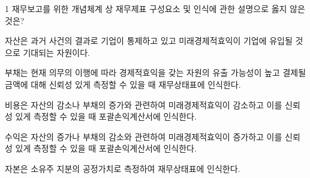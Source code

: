 \begin{question}{1}
재무보고를 위한 개념체계 상 재무제표 구성요소 및 인식에 관한 설명으로 옳지 않은 것은?
\begin{choices}
  \item 자산은 과거 사건의 결과로 기업이 통제하고 있고 미래경제적효익이 기업에 유입될 것으로 기대되는 자원이다.
  \item 부채는 현재 의무의 이행에 따라 경제적효익을 갖는 자원의 유출 가능성이 높고 결제될 금액에 대해 신뢰성 있게 측정할 수 있을 때 재무상태표에 인식한다.
  \item 비용은 자산의 감소나 부채의 증가와 관련하여 미래경제적효익이 감소하고 이를 신뢰성 있게 측정할 수 있을 때 포괄손익계산서에 인식한다.
  \item 수익은 자산의 증가나 부채의 감소와 관련하여 미래경제적효익이 증가하고 이를 신뢰성 있게 측정할 수 있을 때 포괄손익계산서에 인식한다.
  \item 자본은 소유주 지분의 공정가치로 측정하여 재무상태표에 인식한다.
\end{choices}
\end{question}
